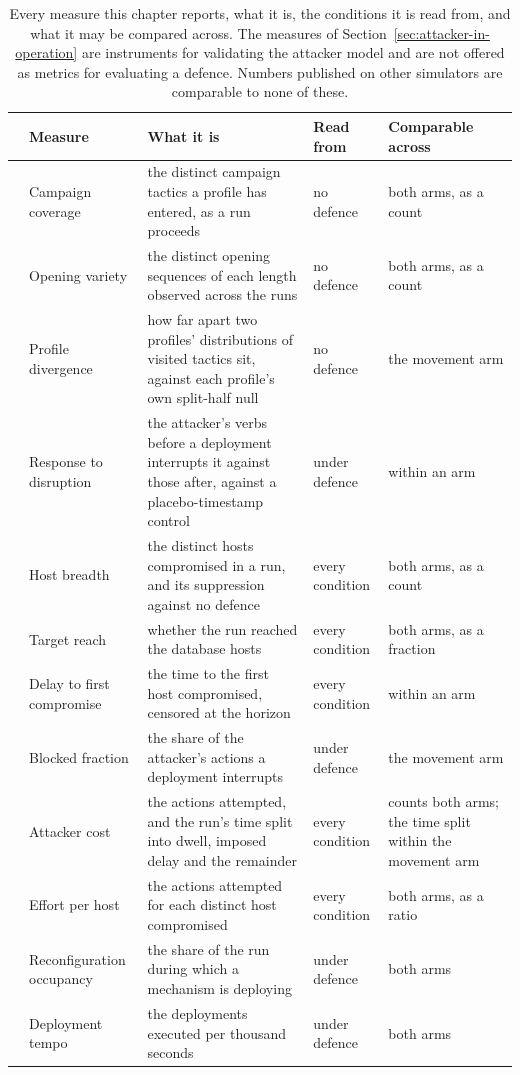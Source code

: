 \begin{table}[htbp]
  \centering
  \caption[The measures, and what each may be compared across]{Every measure this chapter reports, what it is, the conditions it is read from, and what it may be compared across. The measures of Section~\ref{sec:attacker-in-operation} are instruments for validating the attacker model and are not offered as metrics for evaluating a defence. Numbers published on other simulators are comparable to none of these.}
  \label{tab:measures}
  \tablestyle\setlength{\tabcolsep}{4pt}
  \begin{tabular}{@{}cP{2.6cm}P{4.8cm}P{2.6cm}P{3.1cm}@{}}
    \toprule
    & Measure & What it is & Read from & Comparable across \\
    \midrule
    & Campaign coverage & the distinct campaign tactics a profile has entered, as a run proceeds & no defence & both arms, as a count \\
    & Opening variety & the distinct opening sequences of each length observed across the runs & no defence & both arms, as a count \\
    & Profile divergence & how far apart two profiles' distributions of visited tactics sit, against each profile's own split-half null & no defence & the movement arm \\
     & Response to disruption & the attacker's verbs before a deployment interrupts it against those after, against a placebo-timestamp control & under defence & within an arm \\
    \midrule
    & Host breadth & the distinct hosts compromised in a run, and its suppression against no defence & every condition & both arms, as a count \\
    & Target reach & whether the run reached the database hosts & every condition & both arms, as a fraction \\
    & Delay to first compromise & the time to the first host compromised, censored at the horizon & every condition & within an arm \\
     & Blocked fraction & the share of the attacker's actions a deployment interrupts & under defence & the movement arm \\
    \midrule
    & Attacker cost & the actions attempted, and the run's time split into dwell, imposed delay and the remainder & every condition & counts both arms; the time split within the movement arm \\
    & Effort per host & the actions attempted for each distinct host compromised & every condition & both arms, as a ratio \\
    & Reconfiguration occupancy & the share of the run during which a mechanism is deploying & under defence & both arms \\
     & Deployment tempo & the deployments executed per thousand seconds & under defence & both arms \\
    \bottomrule
  \end{tabular}
\end{table}
